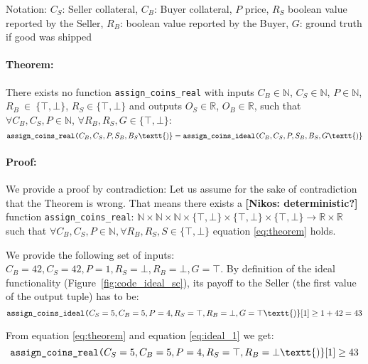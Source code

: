 \documentclass{cacthesis}
\newcommand{\authnote}[3]{{ \footnotesize \textbf{#1[#2: #3]~}}}
\newcommand{\niknote}[1]{\authnote{\color{red}}{Nikos}{#1}}
\begin{document}
Notation: $C_S$: Seller collateral, $C_B$: Buyer collateral, $P$ price, $R_S$ boolean value reported by the Seller, $R_B$: boolean value reported by the Buyer, $G$: ground truth if good was shipped

\paragraph{Theorem:}There exists no function \texttt{assign\_coins\_real} with inputs $C_B \in \mathbb{N}$, $C_S \in \mathbb{N}$, $P \in \mathbb{N}$, $R_B~\in~\{\top,\bot\}$, $R_S \in \{\top,\bot\}$ and outputs  $O_S \in \mathbb{R}$, $O_B \in \mathbb{R}$, such that
 $\forall C_B, C_S, P\in \mathbb{N}$, $\forall R_B,R_S,G \in \{\top,\bot\}$:
\begin{equation}
\label{eq:theorem}
    \texttt{assign\_coins\_real(}C_B, C_S, P, S_B, B_S\textt{)} = \texttt{assign\_coins\_ideal(}C_B, C_S, P, S_B, B_S,G\textt{)}
\end{equation}

\paragraph{Proof:}\label{sec:proof} 
We provide a proof by contradiction: Let us assume for the sake of contradiction that the Theorem is wrong. That means there exists a \niknote{deterministic?} function \texttt{assign\_coins\_real}: %
$\mathbb{N}\times \mathbb{N}\times \mathbb{N}\times \{\top,\bot\}\times \{\top,\bot\}\times \{\top,\bot\} \to \mathbb{R}\times \mathbb{R}$ 
such that $\forall C_B, C_S, P\in \mathbb{N}, \forall R_B,R_S,S \in \{\top,\bot\}$ equation \ref{eq:theorem} holds.\newline

We provide the following set of inputs: $C_B=42,C_S=42,P=1,R_S=\bot,R_B=\bot,G=\top$.
By definition of the ideal functionality (Figure~\ref{fig:code_ideal_sc}), its payoff to the Seller (the first value of the output tuple) has to be:
\begin{equation}
\label{eq:ideal_1}
     \texttt{assign\_coins\_ideal(}C_S=5,C_B=5,P=4,R_S=\top,R_B=\bot,G=\top\textt{)}[1] \geq  1 + 42 = 43
\end{equation}

From equation \ref{eq:theorem} and equation \ref{eq:ideal_1} we get:
\begin{equation}
\label{eq:real_1}
     \texttt{assign\_coins\_real(}C_S=5,C_B=5,P=4,R_S=\top,R_B=\bot\textt{)}[1] \geq 43
\end{equation}
\end{document}
